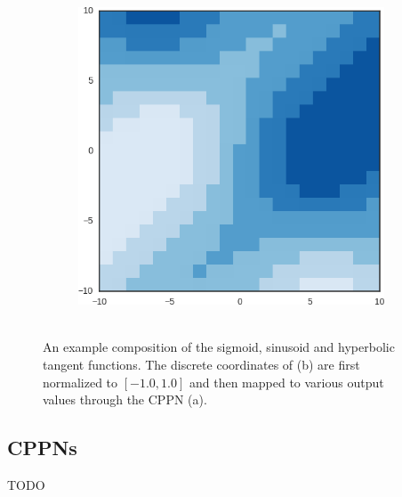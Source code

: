 \begin{figure}
\begin{subfigure}[b]{.25\columnwidth}
\caption{~}
\end{subfigure}\hfill%
\begin{subfigure}[b]{.65\columnwidth}
\centering
\includegraphics[width=\columnwidth]{fig/cppn_pattern}
\caption{~}
\end{subfigure}

\caption[Example CPPN]{An example composition of the sigmoid, sinusoid and hyperbolic tangent functions.
The discrete coordinates of (b) are first normalized to $[-1.0, 1.0]$ and then mapped to various output values through the CPPN (a).
}
\label{fig:cppn}
\end{figure}



\subsection{CPPNs}
TODO

